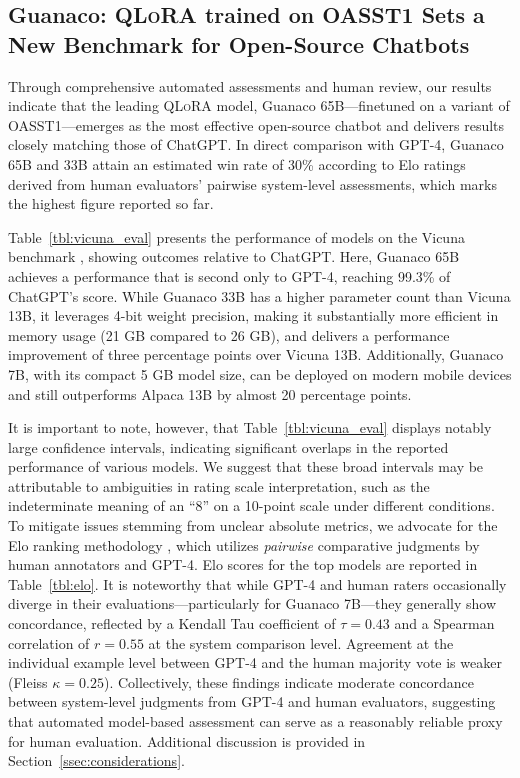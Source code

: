 \subsection{\textbf{Guanaco}: \textsc{QLoRA} trained on OASST1 Sets a New Benchmark for Open-Source Chatbots} 

Through comprehensive automated assessments and human review, our results indicate that the leading \textsc{QLoRA} model, {Guanaco} 65B—finetuned on a variant of OASST1—emerges as the most effective open-source chatbot and delivers results closely matching those of ChatGPT. In direct comparison with GPT-4, {Guanaco} 65B and 33B attain an estimated win rate of 30\% according to Elo ratings derived from human evaluators' pairwise system-level assessments, which marks the highest figure reported so far.

Table~\ref{tbl:vicuna_eval} presents the performance of models on the Vicuna benchmark \cite{vicuna2023}, showing outcomes relative to ChatGPT. Here, {Guanaco} 65B achieves a performance that is second only to GPT-4, reaching 99.3\% of ChatGPT’s score. While {Guanaco} 33B has a higher parameter count than Vicuna 13B, it leverages 4-bit weight precision, making it substantially more efficient in memory usage (21 GB compared to 26 GB), and delivers a performance improvement of three percentage points over Vicuna 13B. Additionally, {Guanaco} 7B, with its compact 5 GB model size, can be deployed on modern mobile devices and still outperforms Alpaca 13B by almost 20 percentage points.

It is important to note, however, that Table~\ref{tbl:vicuna_eval} displays notably large confidence intervals, indicating significant overlaps in the reported performance of various models. We suggest that these broad intervals may be attributable to ambiguities in rating scale interpretation, such as the indeterminate meaning of an “8” on a 10-point scale under different conditions. To mitigate issues stemming from unclear absolute metrics, we advocate for the Elo ranking methodology \citep{elo1967proposed}, which utilizes \textit{pairwise} comparative judgments by human annotators and GPT-4. Elo scores for the top models are reported in Table~\ref{tbl:elo}. It is noteworthy that while GPT-4 and human raters occasionally diverge in their evaluations—particularly for Guanaco 7B—they generally show concordance, reflected by a Kendall Tau coefficient of $\tau=0.43$ and a Spearman correlation of $r=0.55$ at the system comparison level. Agreement at the individual example level between GPT-4 and the human majority vote is weaker (Fleiss $\kappa=0.25$). Collectively, these findings indicate moderate concordance between system-level judgments from GPT-4 and human evaluators, suggesting that automated model-based assessment can serve as a reasonably reliable proxy for human evaluation. Additional discussion is provided in Section~\ref{ssec:considerations}.

